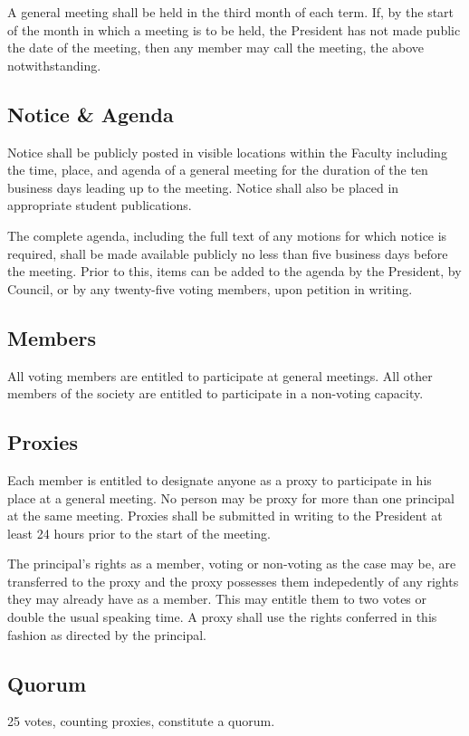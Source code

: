 A general meeting shall be held in the third month of each term. If, by the
start of the month in which a meeting is to be held, the President has not
made public the date of the meeting, then any member may call the meeting, the
above notwithstanding.

\subsection{Notice \& Agenda}
Notice shall be publicly posted in visible locations within the Faculty
including the time, place, and agenda of a general meeting for the duration of
the ten business days leading up to the meeting. Notice shall also be placed in
appropriate student publications.

The complete agenda, including the full text of any motions for which notice is
required, shall be made available publicly no less than five business days
before the meeting. Prior to this, items can be added to the agenda by the
President, by Council, or by any twenty-five voting members, upon petition in
writing.

\subsection{Members}
All voting members are entitled to participate at general meetings. All other
members of the society are entitled to participate in a non-voting capacity.

\subsection{Proxies}
Each member is entitled to designate anyone as a proxy to participate in his
place at a general meeting. No person may be proxy for more than one principal
at the same meeting. Proxies shall be submitted in writing to the President at
least 24 hours prior to the start of the meeting.

The principal's rights as a member, voting or non-voting as the case may be, are
transferred to the proxy and the proxy possesses them indepedently of any rights
they may already have as a member. This may entitle them to two votes or double
the usual speaking time. A proxy shall use the rights conferred in this fashion
as directed by the principal.

\subsection{Quorum}
25 votes, counting proxies, constitute a quorum.

